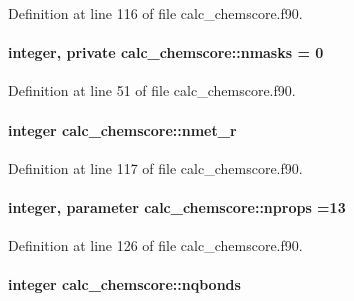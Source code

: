Definition at line 116 of file calc\-\_\-chemscore.\-f90.

\hypertarget{classcalc__chemscore_a7a4e890daa5f6464f57b789a0a0a82a9}{
\paragraph[{nmasks}]{\setlength{\rightskip}{0pt plus 5cm}integer, private calc\-\_\-chemscore\-::nmasks = 0\hspace{0.3cm}{\ttfamily [private]}}}\label{classcalc__chemscore_a7a4e890daa5f6464f57b789a0a0a82a9}


Definition at line 51 of file calc\-\_\-chemscore.\-f90.

\hypertarget{classcalc__chemscore_abc3a16c3de721ae16d616b77d7cceec2}{
\paragraph[{nmet\-\_\-r}]{\setlength{\rightskip}{0pt plus 5cm}integer calc\-\_\-chemscore\-::nmet\-\_\-r}}\label{classcalc__chemscore_abc3a16c3de721ae16d616b77d7cceec2}


Definition at line 117 of file calc\-\_\-chemscore.\-f90.

\hypertarget{classcalc__chemscore_a21d027f3f912e3305b65b0db008c5053}{
\paragraph[{nprops}]{\setlength{\rightskip}{0pt plus 5cm}integer, parameter calc\-\_\-chemscore\-::nprops =13}}\label{classcalc__chemscore_a21d027f3f912e3305b65b0db008c5053}


Definition at line 126 of file calc\-\_\-chemscore.\-f90.

\hypertarget{classcalc__chemscore_a95d0411713ed1669162b176b8fd96065}{
\paragraph[{nqbonds}]{\setlength{\rightskip}{0pt plus 5cm}integer calc\-\_\-chemscore\-::nqbonds}}\label{classcalc__chemscore_a95d0411713ed1669162b176b8fd96065}


